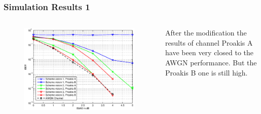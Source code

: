 \documentclass{beamer}
\begin{document}

\begin{frame}
\frametitle{Simulation Results 1}
\begin{columns}[c]
\begin{figure}
\includegraphics[width=.99\textwidth]{figure_vision3.eps}%
\end{figure}
After the modification the results of channel Proakis A have been very closed to the AWGN performance. But the Proakis B one is still high. 
\end{columns}

\end{frame}
\end{document}

